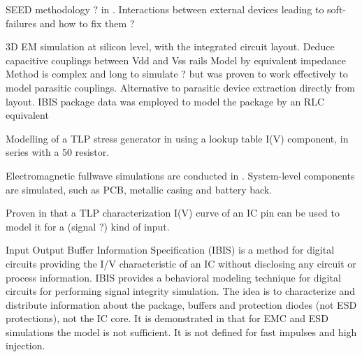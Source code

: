 %
SEED methodology ? in \cite{usb2ESDProtection}.
Interactions between external devices leading to soft-failures and how to fix them ?

3D EM simulation \cite{LacrampeTransientImmunity} at silicon level, with the integrated circuit layout.
Deduce capacitive couplings between Vdd and Vss rails
Model by equivalent impedance
Method is complex and long to simulate ? but was proven to work effectively to model parasitic couplings.
Alternative to parasitic device extraction directly from layout.
IBIS package data was employed to model the package by an RLC equivalent

%
Modelling of a TLP stress generator in \cite{LacrampeTransientImmunity} using a lookup table I(V) component, in series with a 50\textOmega{} resistor.

Electromagnetic fullwave simulations are conducted in \cite{softFailMobile}.
System-level components are simulated, such as PCB, metallic casing and battery back.

Proven in \cite{usb2ESDProtection} that a TLP characterization I(V) curve of an IC pin can be used to model it for a (signal ?) kind of input.

Input Output Buffer Information Specification (IBIS) \cite{ibis-spec} is a method for digital circuits providing the I/V characteristic of an IC without disclosing any circuit or process information.
IBIS provides a behavioral modeling technique for digital circuits for performing signal integrity simulation.
The idea is to characterize and distribute information about the package, buffers and protection diodes (not ESD protections), not the IC core.
It is demonstrated in \cite{ibisImprovementFabrice} that for EMC and ESD simulations the model is not sufficient.
It is not defined for fast impulses and high injection.
